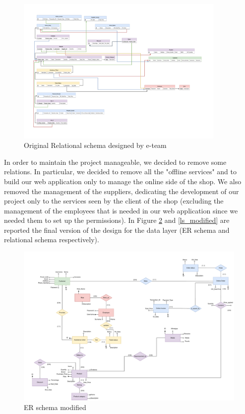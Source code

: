 \begin{figure}
\centering
\includegraphics[width=0.9\textwidth,height=0.9\textheight,keepaspectratio]{Schemas/LogicRS_original.drawio.pdf}
\caption{Original Relational schema designed by e-team}
\label{ls_original}
\end{figure}
\restoregeometry
In order to maintain the project manageable, we decided to remove some relations. In particular, we decided to remove all the "offline services" and to build our web application only to manage the online side of the shop.
We also removed the management of the suppliers, dedicating the development of our project only to the services seen by the client of the shop (excluding the management of the employees that is needed in our web application since we needed them to set up the permissions). In Figure \ref{er_modified} and \ref{ls_modified} are reported the final version of the design for the data layer (ER schema and relational schema respectively).

\begin{figure}
\centering
\includegraphics[width=\textwidth,height=\textheight,keepaspectratio]{Schemas/ER_modified.drawio.pdf}
\caption{ER schema modified}
\label{er_modified}
\end{figure}

